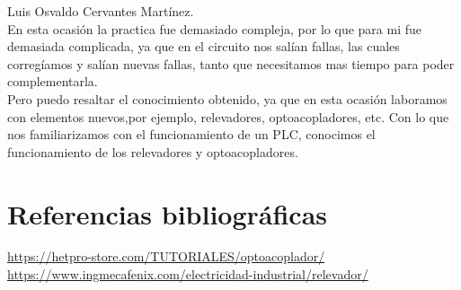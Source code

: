 \documentclass[12pt,a4paper]{article}
\begin{document}
Luis Osvaldo Cervantes Martínez.\\
En esta ocasión la practica fue demasiado compleja, por lo que para mi fue demasiada complicada, ya que en el circuito nos salían fallas, las cuales corregíamos y salían nuevas fallas, tanto que necesitamos mas tiempo para poder complementarla.\\
Pero puedo resaltar el conocimiento obtenido, ya que en esta ocasión laboramos con elementos nuevos,por ejemplo, relevadores, optoacopladores, etc. Con lo que nos familiarizamos con el funcionamiento de un PLC, conocimos el funcionamiento de los relevadores y optoacopladores.\\ 
\newpage
\section{Referencias bibliográficas}
\url{https://hetpro-store.com/TUTORIALES/optoacoplador/}\\
\url{https://www.ingmecafenix.com/electricidad-industrial/relevador/}
\end{document}
